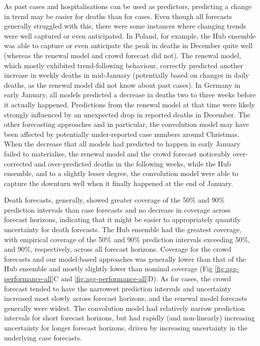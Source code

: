 \documentclass[10pt,letterpaper]{article}
\begin{document}
As past cases and hospitalisations can be used as predictors, predicting
a change in trend may be easier for deaths than for cases. Even though
all forecasts generally struggled with this, there were some instances
where changing trends were well captured or even anticipated. In Poland,
for example, the Hub ensemble was able to capture or even anticipate the
peak in deaths in December quite well (whereas the renewal model and
crowd forecast did not). The renewal model, which mostly exhibited
trend-following behaviour, correctly predicted another increase in
weekly deaths in mid-January (potentially based on changes in daily
deaths, as the renewal model did not know about past cases). In Germany
in early January, all models predicted a decrease in deaths two to three
weeks before it actually happened. Predictions from the renewal model at
that time were likely strongly influenced by an unexpected drop in
reported deaths in December. The other forecasting approaches and in
particular, the convolution model may have been affected by potentially
under-reported case numbers around Christmas. When the decrease that all
models had predicted to happen in early January failed to materialise,
the renewal model and the crowd forecast noticeably over-corrected and
over-predicted deaths in the following weeks, while the Hub ensemble,
and to a slightly lesser degree, the convolution model were able to
capture the downturn well when it finally happened at the end of
January.

Death forecasts, generally, showed greater coverage of the 50\% and 90\%
prediction intervals than case forecasts and no decrease in coverage
across forecast horizons, indicating that it might be easier to
appropriately quantify uncertainty for death forecasts. The Hub ensemble
had the greatest coverage, with empirical coverage of the 50\% and 90\%
prediction intervals exceeding 50\%, and 90\%, respectively, across all
forecast horizons. Coverage for the crowd forecasts and our model-based
approaches was generally lower than that of the Hub ensemble and mostly
slightly lower than nominal coverage (Fig \ref{fig:agg-performance-all}C
and \ref{fig:agg-performance-all}D). As for cases, the crowd forecast
tended to have the narrowest prediction intervals and uncertainty
increased most slowly across forecast horizons, and the renewal model
forecasts generally were widest. The convolution model had relatively
narrow prediction intervals for short forecast horizons, but had rapidly
(and non-linearly) increasing uncertainty for longer forecast horizons,
driven by increasing uncertainty in the underlying case forecasts.
\end{document}
